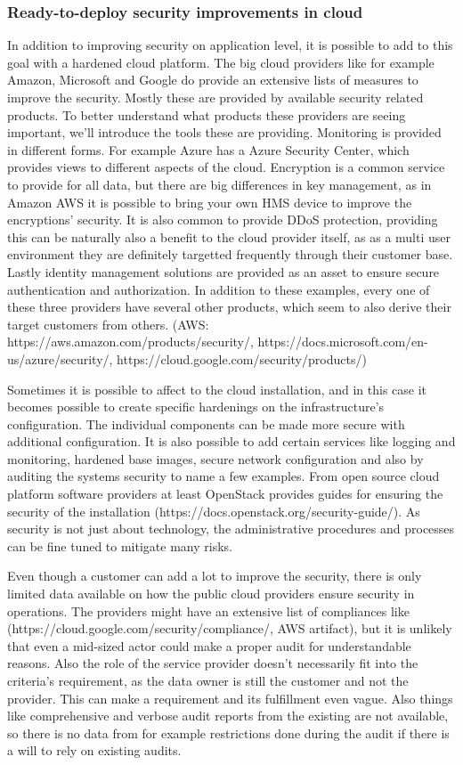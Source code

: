 \documentclass{article}
\begin{document}
\subsubsection{Ready-to-deploy security improvements in cloud}
In addition to improving security on application level, it is possible to add to this goal with a hardened cloud platform. The big cloud providers like for example Amazon, Microsoft and Google do provide an extensive lists of measures to improve the security. Mostly these are provided by available security related products. To better understand what products these providers are seeing important, we'll introduce the tools these are providing. Monitoring is provided in different forms. For example Azure has a Azure Security Center, which provides views to different aspects of the cloud. Encryption is a common service to provide for all data, but there are big differences in key management, as in Amazon AWS it is possible to bring your own HMS device to improve the encryptions' security. It is also common to provide DDoS protection, providing this can be naturally also a benefit to the cloud provider itself, as as a multi user environment they are definitely targetted frequently through their customer base. Lastly identity management solutions are provided as an asset to ensure secure authentication and authorization. In addition to these examples, every one of these three providers have several other products, which seem to also derive their target customers from others. (AWS: https://aws.amazon.com/products/security/, https://docs.microsoft.com/en-us/azure/security/, https://cloud.google.com/security/products/)
\par
Sometimes it is possible to affect to the cloud installation, and in this case it becomes possible to create specific hardenings on the infrastructure's configuration. The individual components can be made more secure with additional configuration. It is also possible to add certain services like logging and monitoring, hardened base images, secure network configuration and also by auditing the systems security to name a few examples. From open source cloud platform software providers at least OpenStack  provides guides for ensuring the security of the installation (https://docs.openstack.org/security-guide/). As security is not just about technology, the administrative procedures and processes can be fine tuned to mitigate many risks.
\par
Even though a customer can add a lot to improve the security, there is only limited data available on how the public cloud providers ensure security in operations. The providers might have an extensive list of compliances like (https://cloud.google.com/security/compliance/, AWS artifact), but it is unlikely that even a mid-sized actor could make a proper audit for understandable reasons. Also the role of the service provider doesn't necessarily fit into the criteria's requirement, as the data owner is still the customer and not the provider. This can make a requirement and its fulfillment even vague. Also things like comprehensive and verbose audit reports from the existing are not available, so there is no data from for example restrictions done during the audit if there is a will to rely on existing audits.
\end{document}
